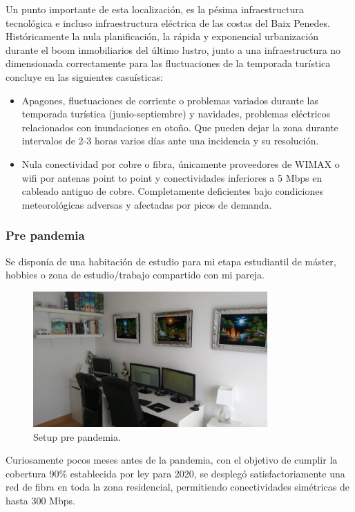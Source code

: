 Un punto importante de esta localización, es la pésima infraestructura tecnológica e incluso infraestructura eléctrica de las costas del Baix Penedes. Históricamente la nula planificación, la rápida y exponencial urbanización durante el boom inmobiliarios del último lustro, junto a una infraestructura no dimensionada correctamente para las fluctuaciones de la temporada turística concluye en las siguientes casuísticas:
\begin{itemize}
    \item Apagones, fluctuaciones de corriente o problemas variados durante las temporada turística (junio-septiembre) y navidades, problemas eléctricos relacionados con inundaciones en otoño. Que pueden dejar la zona durante intervalos de 2-3 horas varios días ante una incidencia y su resolución.
    \item Nula conectividad por cobre o fibra, únicamente proveedores de WIMAX\cite{c_wimax_tech} o wifi por antenas point to point y conectividades inferiores a 5 Mbps en cableado antiguo de cobre. Completamente deficientes bajo condiciones meteorológicas adversas y afectadas por picos de demanda.
\end{itemize}

\subsubsection{Pre pandemia}
Se disponía de una habitación de estudio para mi etapa estudiantil de máster, hobbies o zona de estudio/trabajo compartido con mi pareja.
\begin{figure}[!htb]
\begin{center}
\includegraphics[width=0.8\textwidth]{./figuras/setup_cero.jpg}
\caption{Setup pre pandemia.}
\label{F:setup_cero}
\end{center}
\end{figure}

Curiosamente pocos meses antes de la pandemia, con el objetivo de cumplir la cobertura 90\% establecida por ley para 2020\cite{c_boe_fibra}, se desplegó satisfactoriamente una red de fibra en toda la zona residencial, permitiendo conectividades simétricas de hasta 300 Mbps.

